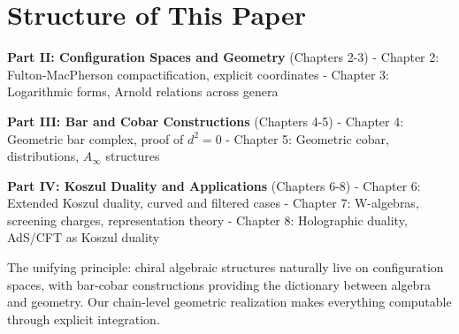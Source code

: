 \section{Structure of This Paper}

\textbf{Part II: Configuration Spaces and Geometry} (Chapters 2-3)
- Chapter 2: Fulton-MacPherson compactification, explicit coordinates
- Chapter 3: Logarithmic forms, Arnold relations across genera

\textbf{Part III: Bar and Cobar Constructions} (Chapters 4-5)
- Chapter 4: Geometric bar complex, proof of $d^2 = 0$
- Chapter 5: Geometric cobar, distributions, $A_\infty$ structures

\textbf{Part IV: Koszul Duality and Applications} (Chapters 6-8)
- Chapter 6: Extended Koszul duality, curved and filtered cases
- Chapter 7: W-algebras, screening charges, representation theory
- Chapter 8: Holographic duality, AdS/CFT as Koszul duality

The unifying principle: chiral algebraic structures naturally live on configuration spaces, with bar-cobar constructions providing the dictionary between algebra and geometry. Our chain-level geometric realization makes everything computable through explicit integration.


